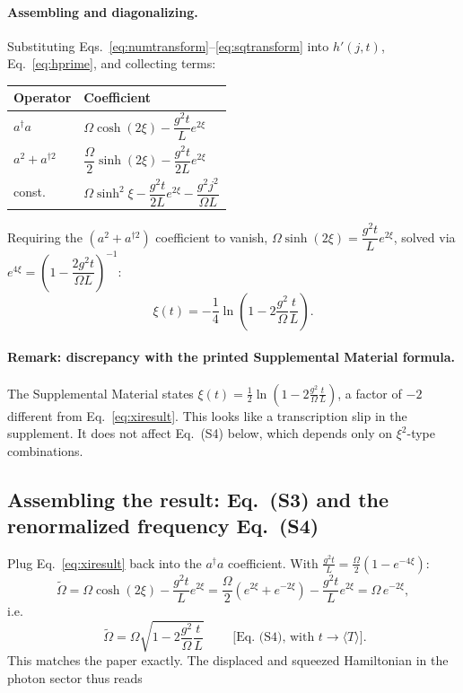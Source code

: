 \documentclass[../../main.tex]{subfiles}
\begin{document}
\paragraph{Assembling and diagonalizing.} Substituting
Eqs.~\eqref{eq:numtransform}--\eqref{eq:sqtransform} into $h'(j,t)$,
Eq.~\eqref{eq:hprime}, and collecting terms:
\begin{center}
\begin{tabular}{ll}
\toprule
Operator & Coefficient \\
\midrule
$a^\dagger a$ & $\Omega\cosh(2\xi)-\dfrac{g^2t}{L}e^{2\xi}$ \\[2mm]
$a^2+a^{\dagger2}$ & $\dfrac{\Omega}{2}\sinh(2\xi)-\dfrac{g^2t}{2L}e^{2\xi}$ \\[2mm]
const. & $\Omega\sinh^2\xi-\dfrac{g^2t}{2L}e^{2\xi}-\dfrac{g^2j^2}{\Omega L}$ \\
\bottomrule
\end{tabular}
\end{center}
Requiring the $(a^2+a^{\dagger2})$ coefficient to vanish,
$\Omega\sinh(2\xi)=\dfrac{g^2t}{L}e^{2\xi}$, solved via
$e^{4\xi}=\left(1-\dfrac{2g^2t}{\Omega L}\right)^{-1}$:
\begin{equation}
\xi(t)=-\frac14\ln\!\left(1-2\frac{g^2}{\Omega}\frac tL\right).
\label{eq:xiresult}
\end{equation}

\paragraph{Remark: discrepancy with the printed Supplemental Material formula.}
The Supplemental Material states $\xi(t)=\tfrac12\ln\!\left(1-2\tfrac{g^2}{\Omega}
\tfrac tL\right)$, a factor of $-2$ different from Eq.~\eqref{eq:xiresult}. This
looks like a transcription slip in the supplement. It does not affect
Eq.~(S4) below, which depends only on $\xi^2$-type combinations.

\subsection*{Assembling the result: Eq.~(S3) and the renormalized frequency Eq.~(S4)}
\label{sec:assembling}

Plug Eq.~\eqref{eq:xiresult} back into the $a^\dagger a$ coefficient. With
$\frac{g^2 t}{L} = \frac{\Omega}{2}(1-e^{-4\xi})$:
\begin{equation}
\tilde\Omega=\Omega\cosh(2\xi)-\frac{g^2t}{L}e^{2\xi}
=\frac{\Omega}{2}\left(e^{2\xi} + e^{-2\xi}\right)
-\frac{g^2 t}{L}e^{2\xi}
=\Omega\,e^{-2\xi},
\end{equation}
i.e.
\begin{equation}
\boxed{\;\tilde\Omega=\Omega\sqrt{1-2\dfrac{g^2}{\Omega}\dfrac{t}{L}}\;}
\qquad\text{[Eq.~(S4), with }t\to\langle T\rangle\text{]}.
\label{eq:OmegaTilde}
\end{equation}
This matches the paper exactly. The displaced and squeezed Hamiltonian in the photon sector thus reads
\end{document}
